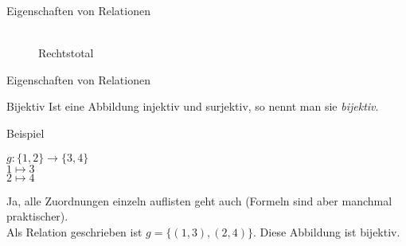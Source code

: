 \begin{frame}{Eigenschaften von Relationen}
\begin{figure}
\begin{minipage}{0.44\textwidth}
      \\ Rechtstotal
    \end{minipage}
  \end{figure}
\end{frame}


\begin{frame}{Eigenschaften von Relationen}
  \begin{block}{Bijektiv}
    Ist eine Abbildung injektiv und surjektiv, so nennt man sie \emph{bijektiv}.
  \end{block}
  \pause
  \begin{exampleblock}{Beispiel}
	\begin{center}
			$g \colon \{1, 2\} \to \{3, 4\}$ \\
			$1 \mapsto 3$ \\
			$2 \mapsto 4$
	\end{center}		
		Ja, alle Zuordnungen einzeln auflisten geht auch (Formeln sind aber manchmal praktischer). \\
		Als Relation geschrieben ist $g = \{(1, 3), (2, 4)\}$. Diese Abbildung ist bijektiv.
	\end{exampleblock}
\end{frame}

